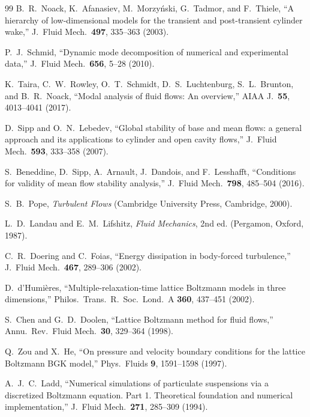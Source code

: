 \documentclass[11pt,a4paper]{article}
\begin{document}
\begin{thebibliography}{99}
B.~R.~Noack, K.~Afanasiev, M.~Morzy\'nski, G.~Tadmor, and F.~Thiele,
``A hierarchy of low-dimensional models for the transient and post-transient
cylinder wake,'' J.\ Fluid Mech.\ \textbf{497}, 335--363 (2003).

P.~J.~Schmid,
``Dynamic mode decomposition of numerical and experimental data,''
J.\ Fluid Mech.\ \textbf{656}, 5--28 (2010).

K.~Taira, C.~W.~Rowley, O.~T.~Schmidt, D.~S.~Luchtenburg, S.~L.~Brunton, and
B.~R.~Noack,
``Modal analysis of fluid flows: An overview,''
AIAA J.\ \textbf{55}, 4013--4041 (2017).

D.~Sipp and O.~N.~Lebedev,
``Global stability of base and mean flows: a general approach and its applications
to cylinder and open cavity flows,'' J.\ Fluid Mech.\ \textbf{593}, 333--358 (2007).

S.~Beneddine, D.~Sipp, A.~Arnault, J.~Dandois, and F.~Lesshafft,
``Conditions for validity of mean flow stability analysis,''
J.\ Fluid Mech.\ \textbf{798}, 485--504 (2016).

S.~B.~Pope, \textit{Turbulent Flows} (Cambridge University Press, Cambridge, 2000).

L.~D.~Landau and E.~M.~Lifshitz,
\textit{Fluid Mechanics}, 2nd ed. (Pergamon, Oxford, 1987).

C.~R.~Doering and C.~Foias,
``Energy dissipation in body-forced turbulence,''
J.\ Fluid Mech.\ \textbf{467}, 289--306 (2002).

D.~d'Humi\`eres,
``Multiple-relaxation-time lattice Boltzmann models in three dimensions,''
Philos.\ Trans.\ R.\ Soc.\ Lond.\ A \textbf{360}, 437--451 (2002).

S.~Chen and G.~D.~Doolen,
``Lattice Boltzmann method for fluid flows,''
Annu.\ Rev.\ Fluid Mech.\ \textbf{30}, 329--364 (1998).

Q.~Zou and X.~He,
``On pressure and velocity boundary conditions for the lattice Boltzmann BGK
model,'' Phys.\ Fluids \textbf{9}, 1591--1598 (1997).

A.~J.~C.~Ladd,
``Numerical simulations of particulate suspensions via a discretized Boltzmann
equation. Part 1. Theoretical foundation and numerical implementation,''
J.\ Fluid Mech.\ \textbf{271}, 285--309 (1994).


\end{thebibliography}
\end{document}
